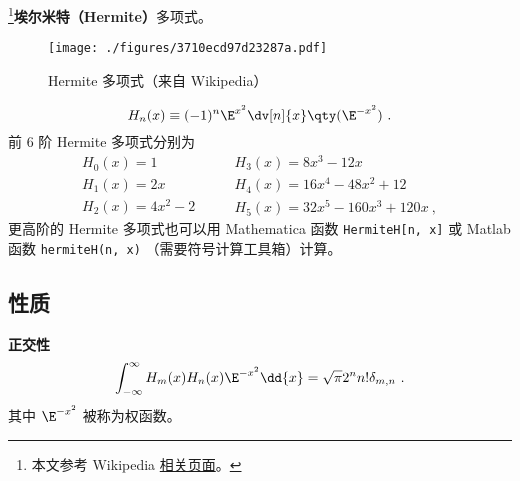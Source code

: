 
\begin{issues}
\issueDraft
\end{issues}

\footnote{本文参考 Wikipedia \href{https://en.wikipedia.org/wiki/Hermite_polynomials}{相关页面}。}\textbf{埃尔米特（Hermite）}多项式。

\begin{figure}[ht]
\centering
\texttt{[image: ./figures/3710ecd97d23287a.pdf]}
\caption{Hermite 多项式（来自 Wikipedia）} \label{fig_HermiP_1}
\end{figure}

\begin{equation}
H_n(x) \equiv (- 1)^n \E^{x^2} \dv[n]{x} \qty(\E^{-x^2})~.
\end{equation}
前 6 阶 Hermite 多项式分别为
\begin{equation}
\begin{array}{l}
H_0(x) = 1\\
H_1(x) = 2x\\
H_2(x) = 4x^2 - 2
\end{array}
\qquad
\begin{array}{l}
H_3(x) = 8x^3 - 12x\\
H_4(x) = 16x^4 - 48x^2 + 12\\
H_5(x) = 32x^5 - 160x^3 + 120x~,
\end{array}
\end{equation}
更高阶的 Hermite 多项式也可以用 Mathematica 函数 \verb|HermiteH[n, x]| 或 Matlab 函数 \verb|hermiteH(n, x)| （需要符号计算工具箱）计算。

\subsection{性质}
\textbf{正交性}
\begin{equation}%
\int_{-\infty}^\infty H_m(x) H_n(x) \E^{-x^2} \dd{x} = \sqrt{\pi}2^n n! \delta_{m,n}~.
\end{equation}
其中 $\E^{-x^2}$ 被称为权函数。
